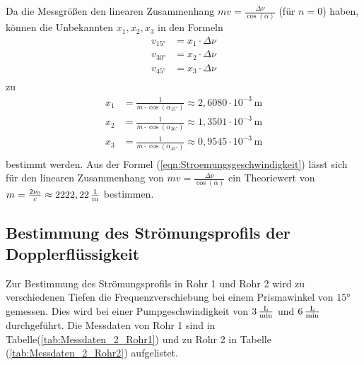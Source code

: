 Da die Messgrößen den linearen Zusammenhang $mv = \frac{\Delta \nu}{\cos(\alpha)}$ (für $n = 0$) haben, können die Unbekannten $x_1, x_2, x_3$ in den Formeln
\begin{align*}
    v_{15°} &= x_1 \cdot \Delta \nu \\
    v_{30°} &= x_2 \cdot \Delta \nu \\
    v_{45°} &= x_3 \cdot \Delta \nu \\
\end{align*}
zu 
\begin{align*}
    x_1 &= \frac{1}{m \cdot \cos(\alpha_{15°})} \approx 2,6080 \cdot 10^{-3}\, \unit{\meter}\\
    x_2 &= \frac{1}{m \cdot \cos(\alpha_{30°})} \approx 1,3501 \cdot 10^{-3}\, \unit{\meter}\\
    x_3 &= \frac{1}{m \cdot \cos(\alpha_{45°})} \approx 0,9545 \cdot 10^{-3}\, \unit{\meter}\\
\end{align*}
bestimmt werden. Aus der Formel (\ref{eqn:Stroemungsgeschwindigkeit}) lässt sich für den linearen Zusammenhang von $mv = \frac{\Delta \nu}{\cos(\alpha)}$ ein 
Theoriewert von $m = \frac{2\nu_0}{c} \approx 2222,22 \, \unit[per-mode=fraction]{\per\meter}$ bestimmen.



\subsection{Bestimmung des Strömungsprofils der Dopplerflüssigkeit}
Zur Bestimmung des Strömungsprofils in Rohr 1 und Rohr 2 wird zu verschiedenen Tiefen die Frequenzverschiebung bei einem Prismawinkel von $15°$ gemessen. 
Dies wird bei einer Pumpgeschwindigkeit von $3 \, \unit[per-mode=fraction]{\liter\per\minute}$ und $6 \, \unit[per-mode=fraction]{\liter\per\minute}$ durchgeführt. 
Die Messdaten von Rohr 1 sind in Tabelle(\ref{tab:Messdaten_2_Rohr1}) und zu Rohr 2 in Tabelle (\ref{tab:Messdaten_2_Rohr2}) aufgelistet. 

